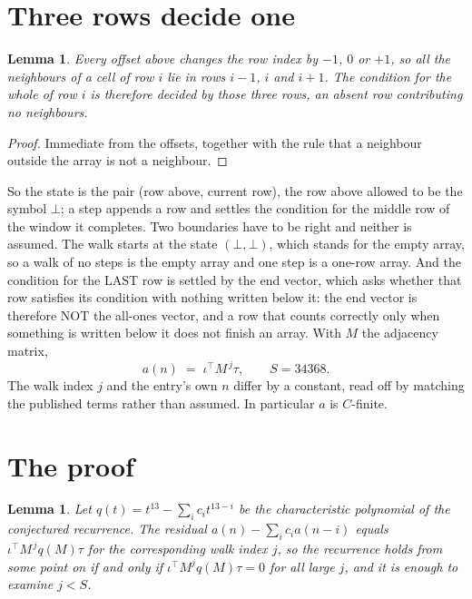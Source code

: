 \documentclass[11pt,a4paper]{article}
\theoremstyle{plain}
\newtheorem{lemma}[theorem]{Lemma}
\theoremstyle{definition}
\begin{document}
\section{Three rows decide one}

\begin{lemma}\label{lem:win}
Every offset above changes the row index by $-1$, $0$ or $+1$, so all the neighbours of a cell
of row $i$ lie in rows $i-1$, $i$ and $i+1$. The condition for the whole of row $i$ is
therefore decided by those three rows, an absent row contributing no neighbours.
\end{lemma}

\begin{proof}
Immediate from the offsets, together with the rule that a neighbour outside the array is not a
neighbour.
\end{proof}

So the state is the pair (row above, current row), the row above allowed to be the symbol
$\bot$; a step appends a row and settles the condition for the middle row of the window it
completes. Two boundaries have to be right and neither is assumed. The walk starts at the state
$(\bot,\bot)$, which stands for the empty array, so a walk of no steps is the empty array and
one step is a one-row array. And the condition for the LAST row is settled by the end vector,
which asks whether that row satisfies its condition with nothing written below it: the end
vector is therefore NOT the all-ones vector, and a row that counts correctly only when
something is written below it does not finish an array. With $M$ the adjacency matrix,
\[
a(n)\;=\;\iota^{\!\top}M^{\,j}\tau ,\qquad S=34368.
\]
The walk index $j$ and the entry's own $n$ differ by a constant, read off by matching the
published terms rather than assumed. In particular $a$ is $C$-finite.

\section{The proof}

\begin{lemma}\label{lem:crit}
Let $q(t)=t^{13}-\sum_i c_it^{13-i}$ be the characteristic polynomial of the
conjectured recurrence. The residual $a(n)-\sum_ic_ia(n-i)$ equals
$\iota^{\!\top}M^{\,j}q(M)\tau$ for the corresponding walk index $j$, so the recurrence
holds from some point on if and only if $\iota^{\!\top}M^{j}q(M)\tau=0$ for all large $j$,
and it is enough to examine $j<S$.
\end{lemma}
\end{document}
